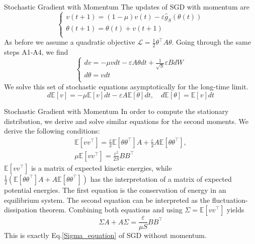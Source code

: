 \documentclass{beamer}
\begin{document}
\begin{frame}{Stochastic Gradient with Momentum}
    The updates of SGD with momentum are
    \[\begin{cases}
        v(t+1) = (1 - \mu)v(t) - \varepsilon\hat{g}_S(\theta(t)) \\
        \theta(t + 1) = \theta(t) + v(t+1) \\
    \end{cases}\]
    As before we assume a quadratic objective $\mathcal{L} = \frac{1}{2}\theta^\top A \theta$. Going through the same steps A1-A4, we find
    \begin{equation}\label{OU_proc_SGD_momentum}
        \begin{cases}
            dv = -\mu vdt - \varepsilon A \theta dt + \frac{1}{\sqrt{S}}\varepsilon B dW \\
            d\theta = v dt \\
        \end{cases}
    \end{equation}
    We solve this set of stochastic equations asymptotically for the long-time limit. 
    \[d\mathbb{E}[v] = -\mu\mathbb{E}[v]dt - \varepsilon A \mathbb{E}[\theta]dt, \quad d\mathbb{E}[\theta] = \mathbb{E}[v]dt\]
\end{frame}

\begin{frame}{Stochastic Gradient with Momentum}
    In order to compute the stationary distribution, we derive and solve similar equations for the second moments. We derive the following conditions:
    \begin{equation}
    \begin{split}
        \mathbb{E}[vv^\top] = \frac{\varepsilon}{2}\mathbb{E}[\theta\theta^\top]A + \frac{\varepsilon}{2}A\mathbb{E}[\theta\theta^\top], \\
        \mu\mathbb{E}[vv^\top] = \frac{\varepsilon^2}{2S}BB^\top
    \end{split}
    \end{equation}
    $\mathbb{E}[vv^\top]$  is a matrix of expected kinetic energies, while $\frac{1}{2}(\mathbb{E}[\theta\theta^\top]A + A\mathbb{E}[\theta\theta^\top])$ has the interpretation of a matrix of expected potential energies. The first equation is the conservation of energy in an equilibrium system. The second equation can be interpreted as the fluctuation-dissipation theorem.  Combining both equations and using $\Sigma = \mathbb{E}[vv^\top]$ yields
    \begin{equation}\label{momentum_sigma_equation}
        \Sigma A + A\Sigma = \frac{\varepsilon}{\mu S}BB^\top
    \end{equation}
    This is exactly Eq.\ref{Sigma_equation} of SGD without momentum. 
\end{frame}
\end{document}
